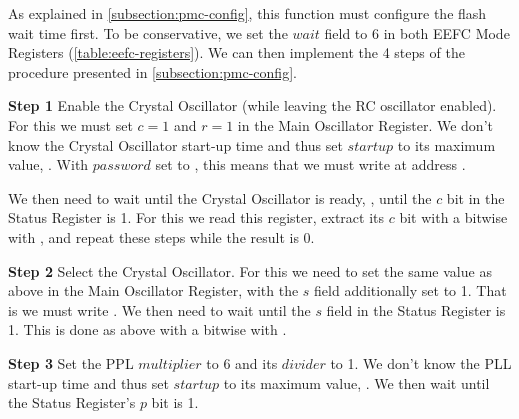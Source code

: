 \begin{paracol}{2}

As explained in \cref{subsection:pmc-config}, this function must configure the
flash  wait time first. To be conservative, we set the $wait$ field to 6 in
both EEFC Mode Registers (\cf \cref{table:eefc-registers}). We can then
implement the 4 steps of the procedure presented in
\cref{subsection:pmc-config}.\bigskip


{\sffamily\bfseries Step 1} Enable the Crystal Oscillator (while leaving the RC
oscillator enabled). For this we must set $c=1$ and $r=1$ in the Main
Oscillator Register. We don't know the Crystal Oscillator start-up time and
thus set $startup$ to its maximum value, . With $password$ set to
, this means that we must write  at address
.


We then need to wait until the Crystal Oscillator is ready, \ie, until the $c$
bit in the Status Register is 1. For this we read this register, extract its
$c$ bit with a bitwise  with , and repeat these steps while
the result is 0.


{\sffamily\bfseries Step 2} Select the Crystal Oscillator. For this we need to
set the same value as above in the Main Oscillator Register, with the $s$ field
additionally set to 1. That is we must write . We then need to
wait until the $s$ field in the Status Register is 1. This is done as above
with a bitwise  with .


{\sffamily\bfseries Step 3} Set the PPL $multiplier$ to 6 and its $divider$ to
1. We don't know the PLL start-up time and thus set $startup$ to its maximum
value, . We then wait until the Status Register's $p$ bit is 1.


\end{paracol}
